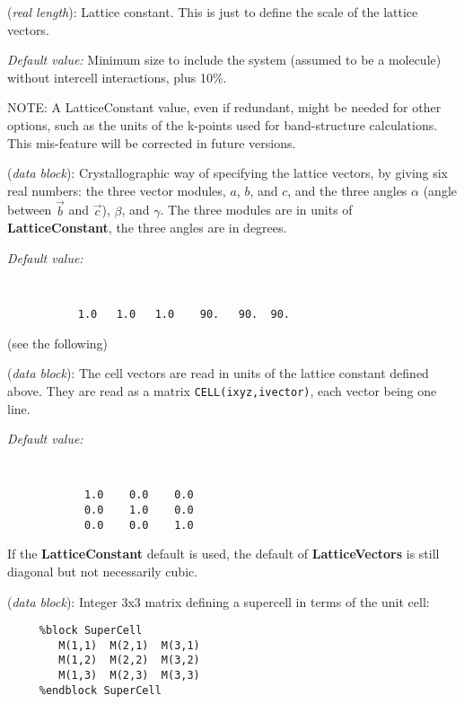 \documentclass[11pt]{article}
\begin{document}
\begin{description}
\itemsep 10pt
\parsep 0pt
\item[{\bf LatticeConstant}] ({\it real length}): 
Lattice constant. This is just to define the scale of the lattice vectors.

{\it Default value:} Minimum size to include the system (assumed to be a 
molecule) without intercell interactions, plus 10\%. 

NOTE: A LatticeConstant value, even if redundant, might be needed for
other options, such as the units of the k-points used for
band-structure calculations. This mis-feature will be corrected in
future versions.

\item[{\bf LatticeParameters}] ({\it data block}): 
Crystallographic way of specifying the lattice vectors, by giving
six real numbers: the three vector modules, $a$, $b$, and $c$, and
the three angles $\alpha$ (angle between $\vec b$ and $\vec c$),
$\beta$, and $\gamma$. The three modules are in units of 
{\bf LatticeConstant}, the three angles are in degrees.

{\it Default value:}
{\tt
\begin{verbatim}
           1.0   1.0   1.0    90.   90.  90.
\end{verbatim}
}
\noindent
(see the following)

\item[{\bf LatticeVectors}] ({\it data block}): 
The cell vectors are read in units of the lattice constant defined above. 
They are read as a matrix {\tt CELL(ixyz,ivector)}, each vector being
one line.

{\it Default value:} 
{\tt 
\begin{verbatim}
            1.0    0.0    0.0 
            0.0    1.0    0.0 
            0.0    0.0    1.0 
\end{verbatim}
}
\noindent
If the {\bf LatticeConstant} default is used, the default of 
{\bf LatticeVectors} is still diagonal but not necessarily cubic.

\item[{\bf SuperCell}] ({\it data block}): 
Integer 3x3 matrix defining a supercell in terms of the unit cell: 

\begin{verbatim}
     %block SuperCell
        M(1,1)  M(2,1)  M(3,1) 
        M(1,2)  M(2,2)  M(3,2) 
        M(1,3)  M(2,3)  M(3,3) 
     %endblock SuperCell
\end{verbatim}


\end{description}
\end{document}
